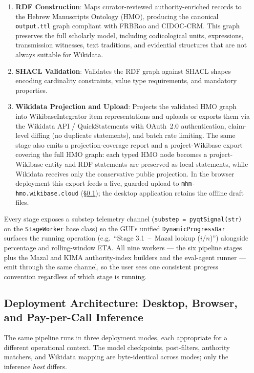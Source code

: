 \documentclass[Afour,sageh,times]{sagej}
\begin{document}
\begin{enumerate}[leftmargin=*]
\item \textbf{RDF Construction}: Maps curator-reviewed authority-enriched records to the Hebrew Manuscripts Ontology (HMO), producing the canonical \texttt{output.ttl} graph compliant with FRBRoo and CIDOC-CRM. This graph preserves the full scholarly model, including codicological units, expressions, transmission witnesses, text traditions, and evidential structures that are not always suitable for Wikidata.

\item \textbf{SHACL Validation}: Validates the RDF graph against SHACL shapes encoding cardinality constraints, value type requirements, and mandatory properties.

\item \textbf{Wikidata Projection and Upload}: Projects the validated HMO graph into WikibaseIntegrator item representations and uploads or exports them via the Wikidata API / QuickStatements with OAuth~2.0 authentication, claim-level diffing (no duplicate statements), and batch rate limiting. The same stage also emits a projection-coverage report and a project-Wikibase export covering the full HMO graph: each typed HMO node becomes a project-Wikibase entity and RDF statements are preserved as local statements, while Wikidata receives only the conservative public projection. In the browser deployment this export feeds a live, guarded upload to \texttt{mhm-hmo.wikibase.cloud} (\S\ref{sec:deployment}); the desktop application retains the offline draft files.
\end{enumerate}

Every stage exposes a substep telemetry channel (\texttt{substep~=~pyqtSignal(str)} on the \texttt{StageWorker} base class) so the GUI's unified \texttt{DynamicProgressBar} surfaces the running operation (e.g.\ ``Stage 3.1~--~Mazal lookup ($i/n$)'') alongside percentage and rolling-window ETA. All nine workers --- the six pipeline stages plus the Mazal and KIMA authority-index builders and the eval-agent runner --- emit through the same channel, so the user sees one consistent progress convention regardless of which stage is running.

\subsection{Deployment Architecture: Desktop, Browser, and Pay-per-Call Inference}
\label{sec:deployment}

The same pipeline runs in three deployment modes, each appropriate for a different operational context. The model checkpoints, post-filters, authority matchers, and Wikidata mapping are byte-identical across modes; only the inference \emph{host} differs.
\end{document}
